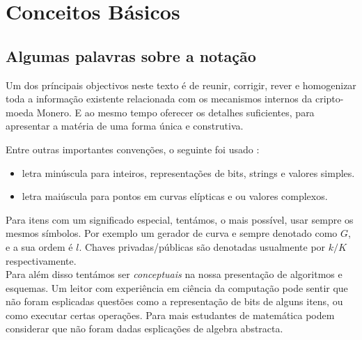 \chapter{Conceitos Básicos}
\label{chapter:basicConcepts}



\section{Algumas palavras sobre a notação}

Um dos príncipais objectivos neste texto é de reunir, corrigir, rever e homogenizar toda a informação existente relacionada com os mecanismos internos da cripto-moeda Monero. E ao mesmo tempo oferecer os detalhes suficientes, para apresentar a matéria de uma forma única e construtiva.

Entre outras importantes convenções, o seguinte foi usado :

\begin{itemize}
\item  letra minúscula para inteiros, representações de bits, strings e valores simples.
\item letra maiúscula para pontos em curvas elípticas e ou valores complexos.
\end{itemize}

Para itens com um significado especial, tentámos, o mais possível, usar sempre os mesmos símbolos. Por exemplo um gerador de curva e sempre denotado como \(G\), e a sua ordem é \(l\). Chaves privadas/públicas são denotadas usualmente por \(k/K\) respectivamente.
\\

Para além disso tentámos ser {\em conceptuais} na nossa presentação de algoritmos e esquemas. Um leitor com experiência em ciência da computação pode sentir que não foram esplicadas questões como a representação de bits de alguns itens, ou como executar certas operações. Para mais estudantes de matemática podem considerar que não foram dadas esplicações de algebra abstracta.   


